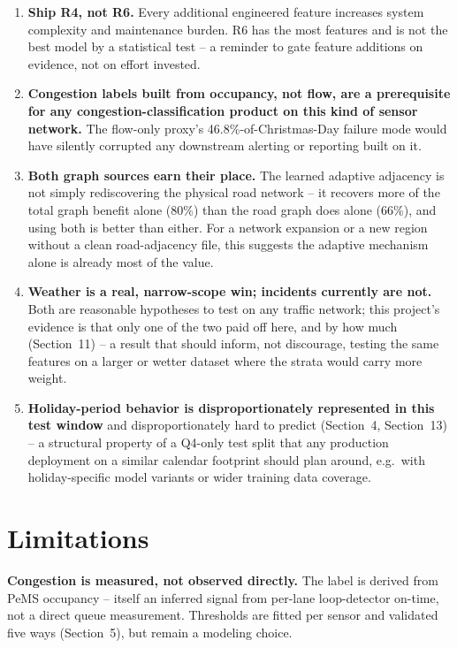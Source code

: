\documentclass[11pt]{article}
\begin{document}
\begin{enumerate}
\item \textbf{Ship R4, not R6.} Every additional engineered feature increases system complexity
  and maintenance burden. R6 has the most features and is not the best model by a statistical
  test -- a reminder to gate feature additions on evidence, not on effort invested.
\item \textbf{Congestion labels built from occupancy, not flow, are a prerequisite for any
  congestion-classification product on this kind of sensor network.} The flow-only proxy's
  46.8\%-of-Christmas-Day failure mode would have silently corrupted any downstream alerting or
  reporting built on it.
\item \textbf{Both graph sources earn their place.} The learned adaptive adjacency is not simply
  rediscovering the physical road network -- it recovers more of the total graph benefit alone
  (80\%) than the road graph does alone (66\%), and using both is better than either. For a
  network expansion or a new region without a clean road-adjacency file, this suggests the
  adaptive mechanism alone is already most of the value.
\item \textbf{Weather is a real, narrow-scope win; incidents currently are not.} Both are
  reasonable hypotheses to test on any traffic network; this project's evidence is that only one
  of the two paid off here, and by how much (Section~11) -- a result that should inform, not
  discourage, testing the same features on a larger or wetter dataset where the strata would
  carry more weight.
\item \textbf{Holiday-period behavior is disproportionately represented in this test window} and
  disproportionately hard to predict (Section~4, Section~13) -- a structural property of a
  Q4-only test split that any production deployment on a similar calendar footprint should plan
  around, e.g.\ with holiday-specific model variants or wider training data coverage.
\end{enumerate}

\section{Limitations}

\begin{riskbox}
\textbf{Congestion is measured, not observed directly.} The label is derived from PeMS
occupancy -- itself an inferred signal from per-lane loop-detector on-time, not a direct queue
measurement. Thresholds are fitted per sensor and validated five ways (Section~5), but remain a
modeling choice.
\end{riskbox}
\end{document}
